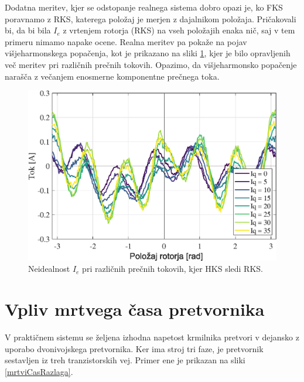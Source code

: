 \documentclass[a4paper,twoside,openright,12pt,slovene]{book}
\begin{document}
Dodatna meritev, kjer se odstopanje realnega sistema dobro opazi je, ko FKS poravnamo z RKS, katerega položaj je merjen z dajalnikom položaja. Pričakovali bi, da bi bila $I_e$ z vrtenjem rotorja (RKS)
na vseh položajih enaka nič, saj v tem primeru nimamo napake ocene. Realna meritev pa pokaže na pojav višjeharmonskega popačenja, kot je prikazano na sliki \ref{tokovniOdzivIs_HKSslediRKS_diff}, kjer
je bilo opravljenih več meritev pri različnih prečnih tokovih. Opazimo, da višjeharmonsko popačenje narašča z večanjem enosmerne komponentne prečnega toka.

\begin{figure}[!htbp]
    \centering
    \includegraphics[width=0.95\columnwidth]{Slike/tokovniOdzivIs_HKSslediRKS_diff.eps}
    \caption{\label{tokovniOdzivIs_HKSslediRKS_diff} Neidealnost $I_e$ pri različnih prečnih tokovih, kjer HKS sledi RKS.}
\end{figure}

\section{Vpliv mrtvega časa pretvornika}

V praktičnem sistemu se željena izhodna napetost krmilnika pretvori v dejansko z uporabo dvonivojskega pretvornika. Ker ima stroj tri faze, je pretvornik sestavljen iz treh tranzistorskih vej. Primer
ene je prikazan na sliki \ref{mrtviCasRazlaga}. 
\end{document}
